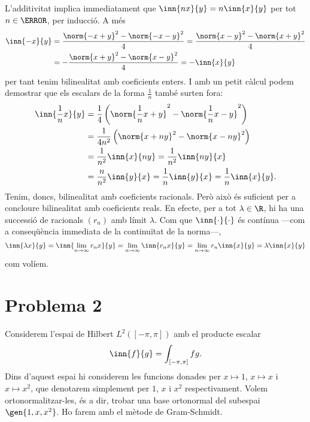 \documentclass[12pt]{article}
\begin{document}
L'additivitat implica immediatament que \( \inn{nx}{y} = n\inn{x}{y} \) per tot \( n \in
\N \), per inducció. A més
\begin{align*}
	\inn{-x}{y} & = \frac{\norm{-x+y}^2 - \norm{-x-y}^2}{4} = \frac{\norm{x-y}^2 -
	\norm{x+y}^2}{4} \\
							& = -\frac{\norm{x+y}^2 - \norm{x-y}^2}{4} = -\inn{x}{y}
\end{align*}
per tant tenim bilinealitat amb coeficients enters. I amb un petit càlcul podem demostrar
que els escalars de la forma \( \frac{1}{n} \) també surten fora:
\begin{align*}
	\inn{\frac{1}{n}x}{y} &= \frac{1}{4}\left(\norm{\frac{1}{n}x + y}^2 - \norm{\frac{1}{n}x -
	y}^2\right) \\
												&= \frac{1}{4n^2}\left(\norm{x+ny}^2 - \norm{x-ny}^2\right) \\
												&= \frac{1}{n^2}\inn{x}{ny} = \frac{1}{n^2}\inn{ny}{x} \\
												& = \frac{n}{n^2}\inn{y}{x} = \frac{1}{n}\inn{y}{x} =
												\frac{1}{n}\inn{x}{y}.
\end{align*}
Tenim, doncs, bilinealitat amb coeficients racionals. Però això és suficient per a
concloure bilinealitat amb coeficients reals. En efecte, per a tot \( \lambda \in \R \),
hi ha una successió de racionals \( (r_n) \) amb límit \( \lambda \). Com que \(
\inn{\cdot}{\cdot} \) és contínua ---com a conseqüència immediata de la continuïtat de la
norma---,
\begin{equation*}
\inn{\lambda x}{y} = \inn{\lim_{n \to \infty}r_n x}{y} = \lim_{n \to \infty} \inn{r_n
x}{y} = \lim_{n \to \infty} r_n \inn{x}{y} = \lambda \inn{x}{y}
\end{equation*}
com volíem.

\section*{Problema 2}
Considerem l'espai de Hilbert \( L^2([-\pi, \pi]) \) amb el producte escalar
\begin{equation*}
	\inn{f}{g} = \int_{[-\pi, \pi]} fg.
\end{equation*}
Dins d'aquest espai hi considerem les funcions donades per \( x \mapsto 1 \), \( x \mapsto
x\) i \( x \mapsto x^2 \), que denotarem simplement per \( 1 \), \( x \) i \( x^2 \)
respectivament. Volem ortonormalitzar-les, és a dir, trobar una base ortonormal del
subespai \( \gen{1, x, x^2} \). Ho farem amb el mètode de Gram-Schmidt.
\end{document}
